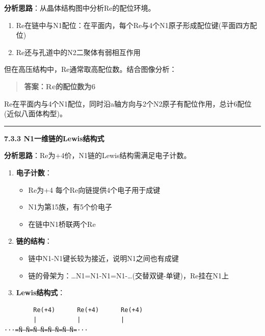 \textbf{分析思路}：从晶体结构图中分析Re的配位环境。

\begin{enumerate}
\def\labelenumi{\arabic{enumi}.}
\tightlist
\item
  Re在链中与N1配位：在平面内，每个Re与4个N1原子形成配位键(平面四方配位)
\item
  Re还与孔道中的N2二聚体有弱相互作用
\end{enumerate}

但在高压结构中，Re通常取高配位数。结合图像分析：

\begin{quote}
\textbf{答案：Re的配位数为6}
\end{quote}

Re在平面内与4个N1配位，同时沿a轴方向与2个N2原子有配位作用，总计6配位(近似八面体构型)。

\begin{center}\rule{0.5\linewidth}{0.5pt}\end{center}

\textbf{7.3.3 N1一维链的Lewis结构式}

\textbf{分析思路}：Re为+4价，N1链的Lewis结构需满足电子计数。

\begin{enumerate}
\def\labelenumi{\arabic{enumi}.}
\tightlist
\item
  \textbf{电子计数}：

  \begin{itemize}
  \tightlist
  \item
    Re为+4 \箭 每个Re向链提供4个电子用于成键
  \item
    N1为第15族，有5个价电子
  \item
    在链中N1桥联两个Re
  \end{itemize}
\item
  \textbf{链的结构}：

  \begin{itemize}
  \tightlist
  \item
    链中N1-N1键长较为接近，说明N1之间也有成键
  \item
    链的骨架为：\ldots N1=N1-N1=N1-\ldots(交替双键-单键)，Re挂在N1上
  \end{itemize}
\item
  \textbf{Lewis结构式}：
\end{enumerate}

\begin{verbatim}
        Re(+4)      Re(+4)      Re(+4)
        |           |           |
···=N̈—N̈=N̈—N̈=N̈—N̈=N̈—N̈=···
\end{verbatim}


